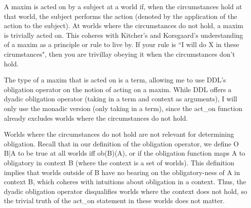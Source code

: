 \begin{isabellebody}
{A maxim is acted on by a subject at a world if, when the circumstances hold at that world, the
subject performs the action (denoted by the application of the action to the subject). At worlds 
where the circumstances do not hold, a maxim is trivially acted on. This coheres with Kitcher's and
 Korsgaard's understanding of a maxim as a principle or rule to live by. If your rule is ``I will 
do X in these cirumstances", then you are trivillay obeying it when the circumstances don't hold.  

The type of a maxim that is acted on is a term, allowing me
to use DDL's obligation operator on the notion of acting on a maxim. While DDL offers a dyadic obligation
operator (taking in a term and context as arguments), I will only use the monadic version (only 
taking in a term), since the act\_on function already excludes worlds where the circumstances do not hold.

Worlds where the circumstances do not hold are not relevant for determining obligation. Recall that in 
our definition of the obligation operator, we define O {B|A} to be true at all worlds iff ob(B)(A), or 
if the obligation function maps A to obligatory in context B (where the context is a set of worlds). This 
definition implies that worlds outside of B have no bearing on the obligatory-ness of A in context B, which 
coheres with intuitions about obligation in a context. Thus, the dyadic obligation operator 
disqualifies worlds where the context does not hold, so the trivial truth of the act\_on statement in 
these worlds does not matter. 

}
\end{isabellebody}
